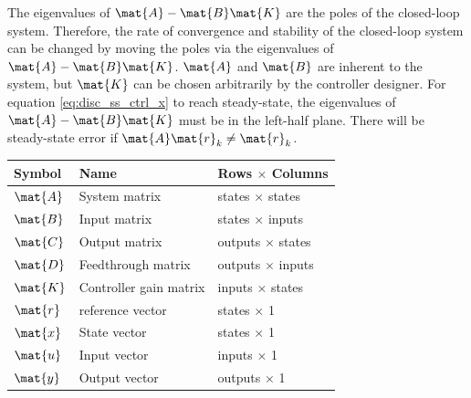 The eigenvalues of $\mat{A} - \mat{B}\mat{K}$ are the poles of the closed-loop
\gls{system}. Therefore, the rate of convergence and stability of the
closed-loop \gls{system} can be changed by moving the poles via the eigenvalues
of $\mat{A} - \mat{B}\mat{K}$. $\mat{A}$ and $\mat{B}$ are inherent to the
\gls{system}, but $\mat{K}$ can be chosen arbitrarily by the controller
designer. For equation \eqref{eq:disc_ss_ctrl_x} to reach steady-state, the
eigenvalues of $\mat{A} - \mat{B}\mat{K}$ must be in the left-half plane. There
will be steady-state error if $\mat{A}\mat{r}_k \ne \mat{r}_k$.
\begin{booktable}
  \begin{tabular}{|lll|}
    \hline
    \rowcolor{headingbg}
    \textbf{Symbol} & \textbf{Name} & \textbf{Rows $\times$ Columns} \\
    \hline
    $\mat{A}$ & System matrix & states $\times$ states \\
    $\mat{B}$ & Input matrix & states $\times$ inputs \\
    $\mat{C}$ & Output matrix & outputs $\times$ states \\
    $\mat{D}$ & Feedthrough matrix & outputs $\times$ inputs \\
    $\mat{K}$ & Controller gain matrix & inputs $\times$ states \\
    $\mat{r}$ & \Gls{reference} vector & states $\times$ 1 \\
    $\mat{x}$ & State vector & states $\times$ 1 \\
    $\mat{u}$ & Input vector & inputs $\times$ 1 \\
    $\mat{y}$ & Output vector & outputs $\times$ 1 \\
    \hline
  \end{tabular}
  \caption{Controller matrix dimensions}
\end{booktable}
